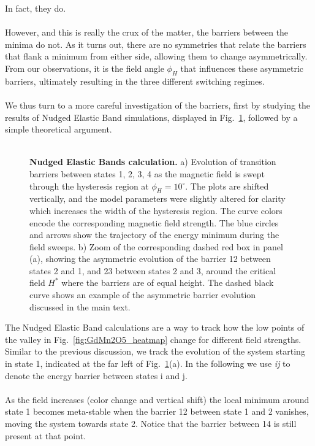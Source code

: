 In fact, they do.
\\\\
However, and this is really the crux of the matter, the barriers between the minima do not. As it turns out, there are no symmetries that relate the barriers that flank a minimum from either side, allowing them to change asymmetrically.
From our observations, it is the field angle $\phi_H$ that influences these asymmetric barriers, ultimately resulting in the three different switching regimes.
\\\\
We thus turn to a more careful investigation of the barriers, first by studying the results of Nudged Elastic Band simulations, displayed in Fig.~\ref{fig:GdMn2O5_neb}, followed by a simple theoretical argument.
\\\\
\begin{figure}[h]
    \caption{\label{fig:GdMn2O5_neb}{\bf Nudged Elastic Bands calculation.}
    a) Evolution of transition barriers between states 1, 2, 3, 4 as the magnetic field is swept through the hysteresis region at $\phi_H = 10^\circ$. The plots are shifted vertically, and the model parameters were slightly altered for clarity which increases the width of the hysteresis region. The curve colors encode the corresponding magnetic field strength. The blue circles and arrows show the trajectory of the energy minimum during the field sweeps.
    b) Zoom of the corresponding dashed red box in panel (a), showing the asymmetric evolution of the barrier 12 between states 2 and 1, and 23 between states 2 and 3, around the critical field $H^\ast$ where the barriers are of equal height. The dashed black curve shows an example of the asymmetric barrier evolution discussed in the main text.
    }
\end{figure}
%
The Nudged Elastic Band calculations are a way to track how the low points of the valley in Fig.~\ref{fig:GdMn2O5_heatmap} change for different field strengths.
Similar to the previous discussion, we track the evolution of the system starting in state 1, indicated at the far left of Fig.~\ref{fig:GdMn2O5_neb}(a).
In the following we use {\it ij} to denote the energy barrier between states i and j.
\\\\
As the field increases (color change and vertical shift) the local minimum around state 1 becomes meta-stable when the barrier 12 between state 1 and 2 vanishes, moving the system towards state 2.
Notice that the barrier between 14 is still present at that point.

